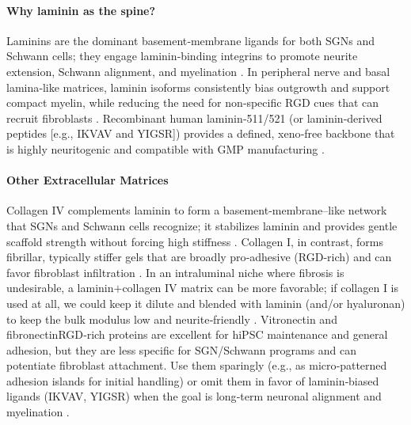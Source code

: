 \documentclass[referee,pdflatex, sn-vancouver-num]{sn-jnl}%
\theoremstyle{thmstyleone}%
\theoremstyle{thmstyletwo}%
\theoremstyle{thmstylethree}%
\begin{document}
\paragraph{Why laminin as the spine?} Laminins are the dominant basement‑membrane ligands for both SGNs and Schwann cells; they engage laminin‑binding integrins to promote neurite extension, Schwann alignment, and myelination \cite{Evans2007LamininFibronectin}. In peripheral nerve and basal lamina‐like matrices, laminin isoforms consistently bias outgrowth and support compact myelin, while reducing the need for non‑specific RGD cues that can recruit fibroblasts \citep{Evans2007LamininFibronectin,Vega1995LamininCollagenIV}. Recombinant human laminin‑511/521 (or laminin‑derived peptides [e.g., IKVAV and YIGSR]) provides a defined, xeno‑free backbone that is highly neuritogenic and compatible with GMP manufacturing \cite{Lu2014XenoFreeIPS}. 

\paragraph{Other Extracellular Matrices}
Collagen IV complements laminin to form a basement‑membrane–like network that SGNs and Schwann cells recognize; it stabilizes laminin and provides gentle scaffold strength without forcing high stiffness \citep{Yurchenco2011BasementMembranes,Yurchenco2009Laminins,Feltri2005LamininsSchwann}. Collagen I, in contrast, forms fibrillar, typically stiffer gels that are broadly pro‑adhesive (RGD‑rich) and can favor fibroblast infiltration \citep{Shoulders2009CollagenStability,Hersel2003RGDReview,Frantz2010ECMGlance,Discher2005Stiffness}. In an intraluminal niche where fibrosis is undesirable, a laminin$+$collagen IV matrix can be more favorable; if collagen I is used at all, we could keep it dilute and blended with laminin (and/or hyaluronan) to keep the bulk modulus low and neurite‑friendly \citep{Bonnans2014ECMRemodel,Feltri2005LamininsSchwann}. Vitronectin and fibronectin\textemdash RGD‑rich proteins are excellent for hiPSC maintenance and general adhesion, but they are less specific for SGN/Schwann programs and can potentiate fibroblast attachment. Use them sparingly (e.g., as micro‑patterned adhesion islands for initial handling) or omit them in favor of laminin‑biased ligands (IKVAV, YIGSR) when the goal is long‑term neuronal alignment and myelination \citep{Evans2007LamininFibronectin}. 
\end{document}

